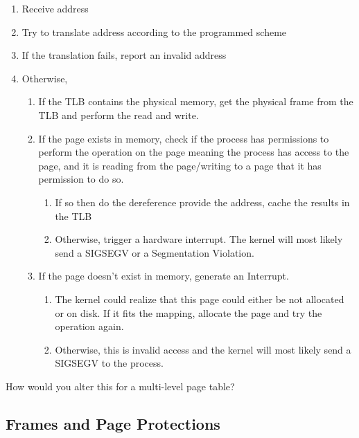 \begin{enumerate}
	\item Receive address
	\item Try to translate address according to the programmed scheme
	\item If the translation fails, report an invalid address
	\item Otherwise,
	      \begin{enumerate}
	      	\item If the TLB contains the physical memory, get the physical frame from the TLB and perform the read and write.
	      	\item If the page exists in memory, check if the process has permissions
	      	      to perform the operation on the page meaning the process has access
	      	      to the page, and it is reading from the page/writing to a page
	      	      that it has permission to do so.
	      	      \begin{enumerate}
	      	      	\item If so then do the dereference provide the address, cache the results in the TLB
	      	      	\item Otherwise, trigger a hardware interrupt. The kernel
	      	      	      will most likely send a SIGSEGV or a Segmentation Violation.
	      	      \end{enumerate}
	      	\item If the page doesn't exist in memory, generate an Interrupt.
	      	      \begin{enumerate}
	      	      	\item The kernel could realize that this page could either be not
	      	      	      allocated or on disk.
	      	      	      If it fits the mapping, allocate the page and try the operation again.
	      	      	\item Otherwise, this is invalid access and the kernel will most likely send a SIGSEGV to the process.
	      	      \end{enumerate}
	      \end{enumerate}
\end{enumerate}
	 
How would you alter this for a multi-level page table?
	 
\subsection{Frames and Page Protections}
	 
